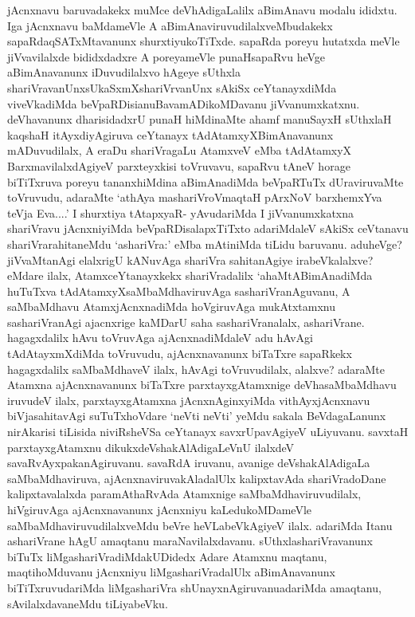 
\begin{artha}
jAcnxnavu baruvadakekx muMce deVhAdigaLalilx aBimAnavu modalu ididxtu. Iga jAcnxnavu baMdameVle A aBimAnaviruvudilalxveMbudakekx sapaRdaqSATxMtavanunx shurxtiyukoTiTxde. sapaRda poreyu hutatxda meVle jiVvavilalxde bididxdadxre A poreyameVle punaHsapaRvu heVge aBimAnavanunx iDuvudilalxvo hAgeye sUthxla shariVravanUnx\break sUkaSxmXshariVrvanUnx sAkiSx ceYtanayxdiMda viveVkadiMda beVpaRDisi\break anuBavamADikoMDavanu jiVvanumxkatxnu. deVhavanunx dharisidadxrU punaH hiMdinaMte ahamf manuSayxH sUthxlaH kaqshaH itAyxdiyAgiruva ceYtanayx tAdAtamxyXBimAnavanunx mADuvudilalx, A eraDu shariVragaLu AtamxveV eMba tAdAtamxyX BarxmavilalxdAgiyeV parxteyxkisi toVruvavu, sapaRvu tAneV horage biTiTxruva poreyu tananxhiMdina aBimAnadiMda beVpaRTuTx dUraviruvaMte toVruvudu, adaraMte `athAya mashariVroV\s maqtaH pArxNoV barxhemxYva teVja Eva....' I shurxtiya tAtapxyaR- yAvudariMda I jiVvanumxkatxna shariVravu jAcnxniyiMda beVpaRDisalapxTiTxto adariMdaleV sAkiSx ceVtanavu shariVrarahitaneMdu `ashariVra:' eMba mAtiniMda tiLidu baruvanu. aduheVge? jiVvaMtanAgi elalxrigU kANuvAga shariVra sahitanAgiye irabeVkalalxve? eMdare ilalx, AtamxceYtanayxkekx shariVradalilx `ahaMtABimAnadiMda huTuTxva tAdAtamxyXsaMbaMdhaviruvAga  sashariVranAguvanu, A saMbaMdhavu AtamxjAcnxnadiMda hoVgiruvAga mukAtxtamxnu sashariVranAgi ajacnxrige kaMDarU saha sashariVranalalx, ashariVrane.  hagagxdalilx hAvu toVruvAga ajAcnxnadiMdaleV adu hAvAgi tAdAtayxmXdiMda toVruvudu, ajAcnxnavanunx biTaTxre sapaRkekx hagagxdalilx saMbaMdhaveV ilalx, hAvAgi toVruvudilalx, alalxve? adaraMte Atamxna ajAcnxnavanunx biTaTxre parxtayxgAtamxnige deVhasaMbaMdhavu iruvudeV ilalx, parxtayxgAtamxna jAcnxnAginxyiMda vithAyxjAcnxnavu biVjasahitavAgi suTuTxhoVdare `neVti neVti' yeMdu sakala BeVdagaLanunx nirAkarisi tiLisida niviRsheVSa ceYtanayx savxrUpavAgiyeV uLiyuvanu. savxtaH parxtayxgAtamxnu dikukxdeVshakAlAdigaLeVnU ilalxdeV savaRvAyxpakanAgiruvanu. savaRdA iruvanu, avanige deVshakAlAdigaLa saMbaMdhaviruva, ajAcnxnaviruvakAladalUlx kalipxtavAda shariVradoDane kalipxtavalalxda paramAthaRvAda Atamxnige saMbaMdhaviruvudilalx, hiVgiruvAga ajAcnxnavanunx jAcnxniyu kaLedukoMDameVle saMbaMdhaviruvudilalxveMdu beVre heVLabeVkAgiyeV ilalx. adariMda Itanu ashariVrane hAgU amaqtanu maraNavilalxdavanu. sUthxlashariVravanunx biTuTx liMgashariVradiMdakUDidedx Adare Atamxnu maqtanu, maqtihoMduvanu jAcnxniyu liMgashariVradalUlx aBimAnavanunx biTiTxruvudariMda liMgashariVra shUnayxnAgiruvanu\break adariMda amaqtanu, sAvilalxdavaneMdu tiLiyabeVku. 
\end{artha}

